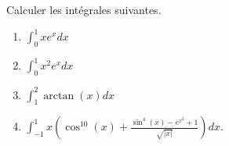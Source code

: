 
\begin{exercice}\label{exomazhe-0014}

	Calculer les intégrales suivantes.

    \begin{multicols}{2}
	
		\begin{enumerate}
			\item
				$\displaystyle\int_0^1xe^xdx$
			\item
				$\displaystyle\int_0^1x^2e^xdx$
			\item
				$\displaystyle\int_1^2\arctan(x)dx$
			\item
				$\displaystyle\int_{-1}^1x\left( \cos^{10}(x)+\frac{ \sin^4(x)- e^{x^2}+1 }{ \sqrt{| x |} } \right)dx$.
		\end{enumerate}
    \end{multicols}

\end{exercice}
